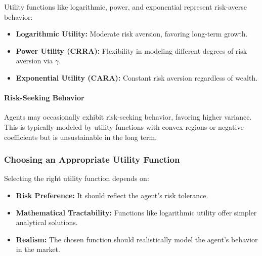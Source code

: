 Utility functions like logarithmic, power, and exponential represent risk-averse behavior:

\begin{itemize}
    \item \textbf{Logarithmic Utility:} Moderate risk aversion, favoring long-term growth.
    \item \textbf{Power Utility (CRRA):} Flexibility in modeling different degrees of risk aversion via \( \gamma \).
    \item \textbf{Exponential Utility (CARA):} Constant risk aversion regardless of wealth.
\end{itemize}

\paragraph{Risk-Seeking Behavior}

Agents may occasionally exhibit risk-seeking behavior, favoring higher variance. This is typically modeled by utility functions with convex regions or negative coefficients but is unsustainable in the long term.

\subsubsection{Choosing an Appropriate Utility Function}

Selecting the right utility function depends on:

\begin{itemize}
    \item \textbf{Risk Preference:} It should reflect the agent’s risk tolerance.
    \item \textbf{Mathematical Tractability:} Functions like logarithmic utility offer simpler analytical solutions.
    \item \textbf{Realism:} The chosen function should realistically model the agent’s behavior in the market.
\end{itemize}

